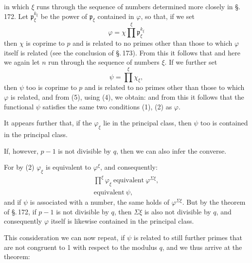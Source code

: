 in which $\xi$ runs through the sequence of numbers determined more closely in \S.\,172.
Let $\mathfrak{p}_\xi^{k_\xi}$ be the power of $\mathfrak{p}_\xi$ contained in $\varphi$,
so that, if we set
\[
\varphi = \chi \prod^{\xi} \mathfrak{p}_\xi^{k_\xi}
\]
then $\chi$ is coprime to $p$ and is related to no primes other than
those to which $\varphi$ itself is related (see the conclusion of
\S.\,173). From this it follows that
and here we again let $n$ run through the sequence of numbers $\xi$.
If we further set
\[
\psi = \prod^{\xi} \chi_\xi,
\]
then $\psi$ too is coprime to $p$ and is related to no primes other
than those to which $\varphi$ is related, and from (5), using (4), we obtain:
and from this it follows that the functional $\psi$ satisfies the same two
conditions (1), (2) as $\varphi$.

It appears further that, if the $\varphi_\xi$ lie in the principal class,
then $\psi$ too is contained in the principal class.

If, however, $p-1$ is not divisible by $q$, then we can also
infer the converse.

For by (2) $\varphi_\xi$ is equivalent to $\varphi^\xi$, and consequently:
\[
\begin{gathered}
\prod^{\xi} \varphi_\xi \ \text{equivalent}\ \varphi^{\Sigma\xi}, \\
\text{equivalent}\ \psi,
\end{gathered}
\]
and if $\psi$ is associated with a number, the same holds
of $\varphi^{\Sigma\xi}$. But by the theorem of \S.\,172, if $p-1$ is not
divisible by $q$, then $\Sigma \xi$ is also not divisible by $q$, and consequently
 $\varphi$ itself is likewise contained in the principal class.

This consideration we can now repeat, if $\psi$ is related to
still further primes that are not congruent to 1 with respect to the
 modulus $q$, and we thus arrive at the
theorem:

